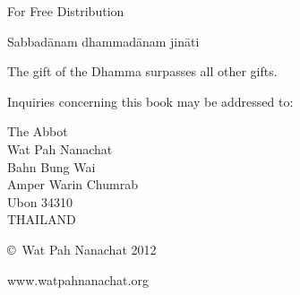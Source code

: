 
For Free Distribution

Sabbadānam dhammadānam jināti

The gift of the Dhamma surpasses all other gifts.

Inquiries concerning this book may be addressed to:

The Abbot\\
Wat Pah Nanachat\\
Bahn Bung Wai\\
Amper Warin Chumrab\\
Ubon 34310\\
THAILAND

\copyright\ Wat Pah Nanachat 2012

www.watpahnanachat.org

